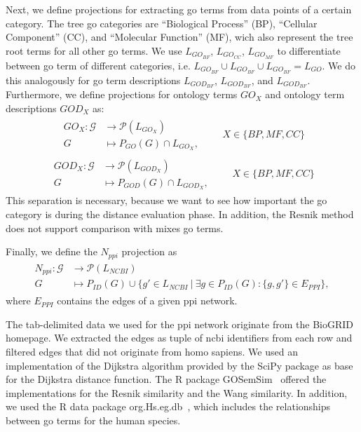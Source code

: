 \documentclass{thesisclass}
\begin{document}
Next, we define projections for extracting \acrfull{go} terms from data points of a certain category.
The tree \acrfull{go} categories are ``Biological Process'' (BP), ``Cellular Component'' (CC), and ``Molecular Function'' (MF), wich also represent the tree root terms for all other \acrshort{go} terms.
We use $L_{GO_{BF}}$, $L_{GO_{CC}}$, $L_{GO_{MF}}$ to differentiate between \acrshort{go} term of different categories, i.e. $L_{GO_{BF}} \cup L_{GO_{BF}} \cup L_{GO_{BF}} = L_{GO}$. We do this analogously for \acrshort{go} term descriptions $L_{GOD_{BF}}$, $L_{GOD_{BF}}$, and $L_{GOD_{BF}}$.
Furthermore, we define projections for ontology terms $GO_X$  and ontology term descriptions $GOD_X$ as:
\begin{align} \label{eq:ontology_projection}
	\begin{split}
		GO_X : \mathcal{G} & \to \mathcal{P}(L_{GO_X}) \\
		G & \mapsto P_{GO}(G) \cap L_{GO_X},
	\end{split} \qquad X \in \lbrace{ BP, MF, CC \rbrace}
\end{align}
\begin{align} \label{eq:ontology_desc_projection}
	\begin{split}
		GOD_X : \mathcal{G} & \to \mathcal{P}(L_{GOD_X}) \\
		G & \mapsto P_{GOD}(G) \cap L_{GOD_X},
	\end{split} \qquad X \in \lbrace{ BP, MF, CC \rbrace}
\end{align}
This separation is necessary, because we want to see how important the \acrshort{go} category is during the distance evaluation phase. In addition, the Resnik method does not support comparison with mixes \acrshort{go} terms.

Finally, we define the $N_{ppi}$ projection as 
\begin{align} \label{eq:ppi_neighbours}
	\begin{split}
		N_{ppi} : \mathcal{G} & \to \mathcal{P}(L_{NCBI}) \\
		G & \mapsto P_{ID}(G) \cup \{g' \in L_{NCBI}\ |\ \exists g \in P_{ID}(G) : \{g, g'\} \in E_{PPI} \},
	\end{split}
\end{align}
where $E_{PPI}$ contains the edges of a given \acrshort{ppi} network.

The tab-delimited data we used for the \acrshort{ppi} network originate from the BioGRID~\cite{doi:10.1093/nar/gkw1102} homepage. We extracted the edges as tuple of \acrshort{ncbi} identifiers from each row and filtered edges that did not originate from homo sapiens. We used an implementation of the Dijkstra algorithm provided by the SciPy package as base for the Dijkstra distance function. The R package GOSemSim~\cite{doi:10.1093/bioinformatics/btq064} offered the implementations for the Resnik similarity and the Wang similarity. In addition, we used the R data package org.Hs.eg.db~\cite{goAnno}, which includes the relationships between \acrshort{go} terms for the human species. 
\end{document}
